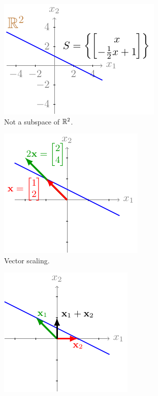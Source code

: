 \begin{figure}[h]
    \centering
    \begin{subfigure}[b]{0.32\textwidth}
        \includegraphics{figure/chapter01/nosubspace1(a).pdf}
        \caption{Not a subspace of $\mathbb{R}^2$.}
        \label{fig:ch01-nosubspace1}
    \end{subfigure}
    \begin{subfigure}[b]{0.32\textwidth}
        \centering
        \includegraphics{figure/chapter01/nosubspace1(b).pdf}
        \caption{Vector scaling.}
        \label{fig:ch01-nosubspace1-scale}
    \end{subfigure}
    \begin{subfigure}[b]{0.32\textwidth}
        \centering
        \includegraphics{figure/chapter01/nosubspace1(c).pdf}

\end{subfigure}
\end{figure}
